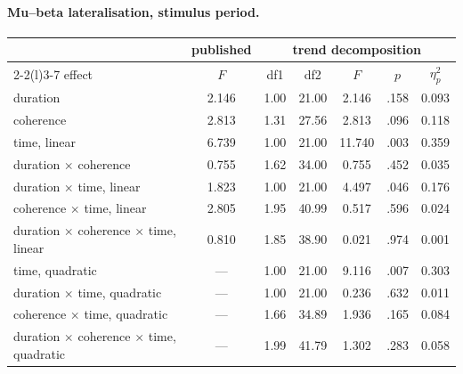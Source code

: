 \paragraph{Mu--beta lateralisation, stimulus period.}
\begin{center}\small
\begin{tabular}{lcccccc}
\toprule
 & \multicolumn{1}{c}{published} & \multicolumn{5}{c}{trend decomposition}\\
\cmidrule(lr){2-2}\cmidrule(l){3-7}
effect & $F$ & df1 & df2 & $F$ & $p$ & $\eta_p^2$\\
\midrule
duration & 2.146 & 1.00 & 21.00 & 2.146 & .158 & 0.093\\
coherence & 2.813 & 1.31 & 27.56 & 2.813 & .096 & 0.118\\
time, linear & 6.739 & 1.00 & 21.00 & 11.740 & .003 & 0.359\\
duration $\times$ coherence & 0.755 & 1.62 & 34.00 & 0.755 & .452 & 0.035\\
duration $\times$ time, linear & 1.823 & 1.00 & 21.00 & 4.497 & .046 & 0.176\\
coherence $\times$ time, linear & 2.805 & 1.95 & 40.99 & 0.517 & .596 & 0.024\\
duration $\times$ coherence $\times$ time, linear & 0.810 & 1.85 & 38.90 & 0.021 & .974 & 0.001\\
time, quadratic & --- & 1.00 & 21.00 & 9.116 & .007 & 0.303\\
duration $\times$ time, quadratic & --- & 1.00 & 21.00 & 0.236 & .632 & 0.011\\
coherence $\times$ time, quadratic & --- & 1.66 & 34.89 & 1.936 & .165 & 0.084\\
duration $\times$ coherence $\times$ time, quadratic & --- & 1.99 & 41.79 & 1.302 & .283 & 0.058\\
\bottomrule
\end{tabular}
\end{center}

